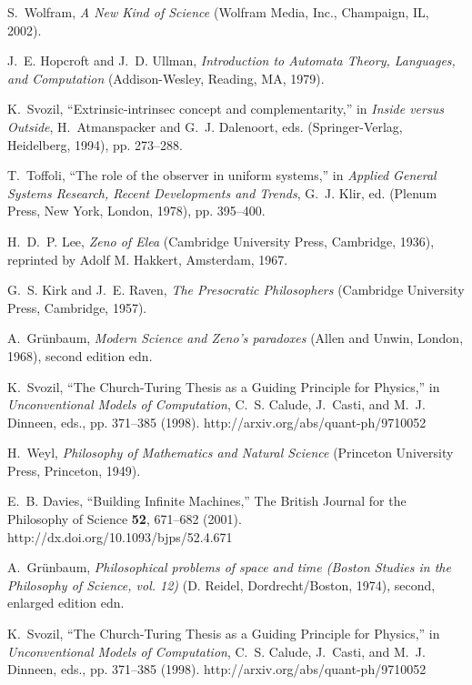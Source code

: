 \documentclass[pre,amssymb,showpacs,showkeys,preprint]{revtex4}
\begin{document}
\begin{thebibliography}{10}
S.~Wolfram, {\em A New Kind of Science\/} (Wolfram Media, Inc., Champaign, IL,
  2002).

J.~E. Hopcroft and J.~D. Ullman, {\em Introduction to Automata Theory,
  Languages, and Computation\/} (Addison-Wesley, Reading, MA, 1979).

K.~Svozil, \enquote{Extrinsic-intrinsec concept and complementarity,} in {\em
  Inside versus Outside\/}, H.~Atmanspacker and G.~J. Dalenoort, eds.
  (Springer-Verlag, Heidelberg, 1994), pp. 273--288.

T.~Toffoli, \enquote{The role of the observer in uniform systems,} in {\em
  Applied General Systems Research, Recent Developments and Trends\/}, G.~J.
  Klir, ed.  (Plenum Press, New York, London, 1978), pp. 395--400.

H.~D.~P. Lee, {\em Zeno of Elea\/} (Cambridge University Press, Cambridge,
  1936), reprinted by Adolf M. Hakkert, Amsterdam, 1967.

G.~S. Kirk and J.~E. Raven, {\em The Presocratic Philosophers\/} (Cambridge
  University Press, Cambridge, 1957).

A.~Gr{\"{u}}nbaum, {\em Modern Science and Zeno's paradoxes\/} (Allen and
  Unwin, London, 1968), second edition edn.

K.~Svozil, \enquote{The {C}hurch-{T}uring Thesis as a Guiding Principle for
  Physics,} in {\em Unconventional Models of Computation\/}, C.~S. Calude,
  J.~Casti, and M.~J. Dinneen, eds.,  pp. 371--385 (1998).
\newline http://arxiv.org/abs/quant-ph/9710052

H.~Weyl, {\em Philosophy of Mathematics and Natural Science\/} (Princeton
  University Press, Princeton, 1949).

E.~B. Davies, \enquote{Building Infinite Machines,} The British Journal for the
  Philosophy of Science {\bf 52}, 671--682 (2001).
\newline http://dx.doi.org/10.1093/bjps/52.4.671

A.~Gr{\"{u}}nbaum, {\em Philosophical problems of space and time (Boston
  Studies in the Philosophy of Science, vol. 12)\/} (D. Reidel,
  Dordrecht/Boston, 1974), second, enlarged edition edn.

K.~Svozil, \enquote{The {C}hurch-{T}uring Thesis as a Guiding Principle for
  Physics,} in {\em Unconventional Models of Computation\/}, C.~S. Calude,
  J.~Casti, and M.~J. Dinneen, eds.,  pp. 371--385 (1998).
\newline http://arxiv.org/abs/quant-ph/9710052


\end{thebibliography}
\end{document}
